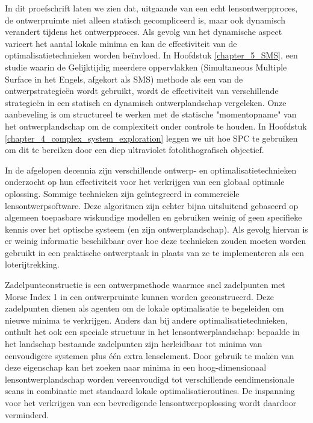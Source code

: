 {%
In dit proefschrift laten we zien dat, uitgaande van een echt lensontwerpproces, de ontwerpruimte niet alleen statisch gecompliceerd is, maar ook dynamisch verandert tijdens het ontwerpproces. Als gevolg van het dynamische aspect varieert het aantal lokale minima en kan de effectiviteit van de optimalisatietechnieken worden beïnvloed. In Hoofdstuk \ref{chapter_5_SMS}, een studie waarin de Gelijktijdig meerdere oppervlakken (Simultaneous Multiple Surface in het Engels, afgekort als SMS) methode als een van de ontwerpstrategieën wordt gebruikt, wordt de effectiviteit van verschillende strategieën in een statisch en dynamisch ontwerplandschap vergeleken. Onze aanbeveling is om structureel te werken met de statische "momentopname" van het ontwerplandschap om de complexiteit onder controle te houden. In Hoofdstuk \ref{chapter_4_complex_system_exploration} leggen we uit hoe SPC te gebruiken om dit te bereiken door een diep ultraviolet fotolithografisch objectief.

In de afgelopen decennia zijn verschillende ontwerp- en optimalisatietechnieken onderzocht op hun effectiviteit voor het verkrijgen van een globaal optimale oplossing. Sommige technieken zijn geïntegreerd in commerciële lensontwerpsoftware. Deze algoritmen zijn echter bijna uitsluitend gebaseerd op algemeen toepasbare wiskundige modellen en gebruiken weinig of geen specifieke kennis over het optische systeem (en zijn ontwerplandschap). Als gevolg hiervan is er weinig informatie beschikbaar over hoe deze technieken zouden moeten worden gebruikt in een praktische ontwerptaak in plaats van ze te implementeren als een loterijtrekking.

Zadelpuntconstructie is een ontwerpmethode waarmee snel zadelpunten met Morse Index 1 in een ontwerpruimte kunnen worden geconstrueerd. Deze zadelpunten dienen als agenten om de lokale optimalisatie te begeleiden om nieuwe minima te verkrijgen. Anders dan bij andere optimalisatietechnieken, onthult het ook een speciale structuur in het lensontwerplandschap: bepaalde in het landschap bestaande zadelpunten zijn herleidbaar tot minima van eenvoudigere systemen plus één extra lenselement. Door gebruik te maken van deze eigenschap kan het zoeken naar minima in een hoog-dimensionaal lensontwerplandschap worden vereenvoudigd tot verschillende eendimensionale scans in combinatie met standaard lokale optimalisatieroutines. De inspanning voor het verkrijgen van een bevredigende lensontwerpoplossing wordt daardoor verminderd.

}
